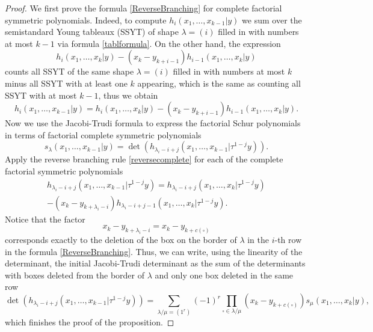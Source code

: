 \documentclass[10pt,a4paper]{amsart}
\begin{document}
\begin{proof}
    We first prove the formula \eqref{ReverseBranching} for complete factorial symmetric polynomials. Indeed, to compute $h_i(x_1, \ldots, x_{k - 1}|y)$ we sum over the semistandard Young tableaux (SSYT) of shape $\lambda = (i)$ filled in with numbers at most $k-1$ via formula \eqref{tablformula}. On the other hand, the expression
    \[
    h_i(x_1, \ldots, x_k|y) - (x_k - y_{k + i - 1})h_{i - 1}(x_1, \ldots, x_k|y)
    \]
    counts all SSYT of the same shape $\lambda = (i)$ filled in with numbers at most $k$ minus all SSYT with at least one $k$ appearing, which is the same as counting all SSYT with at most $k-1$, thus we obtain
    \begin{equation}
    \label{reversecomplete}
    h_i(x_1, \ldots, x_{k - 1}|y) = h_i(x_1, \ldots, x_k|y) - (x_k - y_{k + i - 1})h_{i - 1}(x_1, \ldots, x_k|y).
    \end{equation}
    Now we use the Jacobi-Trudi formula to express the factorial Schur polynomials in terms of factorial complete symmetric polynomials
    \[
    s_{\lambda}(x_1, \ldots, x_{k - 1}|y) = \det(h_{\lambda_{i} - i + j}(x_1, \ldots, x_{k - 1}|\tau^{1 - j}y)).
    \]
    Apply the reverse branching rule \eqref{reversecomplete} for each of the complete factorial symmetric polynomials 
    \begin{multline*}
    h_{\lambda_i - i + j}(x_1, \ldots, x_{k - 1}|\tau^{1-j}y) = h_{\lambda_i - i + j}(x_1, \ldots, x_{k}|\tau^{1-j}y)\\
    - (x_k - y_{k +\lambda_i - i})h_{\lambda_i - i + j - 1}(x_1, \ldots, x_{k}|\tau^{1-j}y).
    \end{multline*}
    Notice that the factor 
    \[
    x_k - y_{k + \lambda_i - i} = x_k - y_{k + c(\square)}
    \]
    corresponds exactly to the deletion of the box on the border of $\lambda$ in the $i$-th row in the formula \eqref{ReverseBranching}. Thus, we can write, using the linearity of the determinant, the initial Jacobi-Trudi determinant as the sum of the determinants with boxes deleted from the border of $\lambda$ and only one box deleted in the same row
    \[
    \det(h_{\lambda_{i} - i + j}(x_1, \ldots, x_{k - 1}|\tau^{1 - j}y)) = \sum\limits_{\lambda/\mu=(1^r)}(-1)^r \prod\limits_{\square \in \lambda / \mu}(x_k - y_{k + c(\square)}) s_{\mu}(x_1, \ldots, x_k|y),
    \]
    which finishes the proof of the proposition.
\end{proof}
\end{document}
